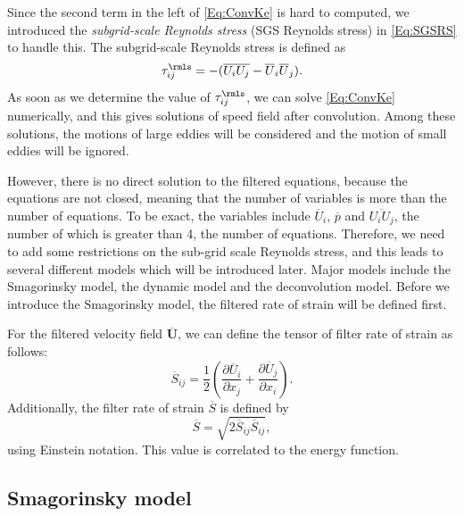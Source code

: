 \documentclass[english, nochinese]{pkupaper}
\begin{document}
Since the second term in the left of \eqref{Eq:ConvKe} is hard to computed, we introduced the \emph{subgrid-scale Reynolds stress} (SGS Reynolds stress) in \eqref{Eq:SGSRS} to handle this. The subgrid-scale Reynolds stress is defined as
\begin{equation}\label{Eq:SGSRS}
\tau_{ij}^{\rmls} = -(\overline{U_iU_j}-\overline{U}_i\overline{U}_j).
\end{equation}
As soon as we determine the value of $\tau_{ij}^{\rmls}$, we can solve \eqref{Eq:ConvKe} numerically, and this gives solutions of speed field after convolution. Among these solutions, the motions of large eddies will be considered and the motion of small eddies will be ignored.

However, there is no direct solution to the filtered equations, because the equations are not closed, meaning that the number of variables is more than the number of equations. To be exact, the variables include $\overline{U}_i$, $\overline{p}$ and $\overline{U_iU_j}$, the number of which is greater than 4, the number of equations. Therefore, we need to add some restrictions on the sub-grid scale Reynolds stress, and this leads to several different models which will be introduced later. Major models include the Smagorinsky model, the dynamic model and the deconvolution model. Before we introduce the Smagorinsky model, the filtered rate of strain will be defined first.

For the filtered velocity field $\overline{\mathbf{U}}$, we can define the tensor of filter rate of strain as follows:
\begin{equation}
\overline{S}_{ij} = \frac{1}{2}\left(\frac{\partial\overline{U}_i}{\partial x_j} + \frac{\partial\overline{U}_j}{\partial x_i}\right).
\end{equation}
Additionally, the filter rate of strain $\overline{S}$ is defined by
\begin{equation}
\overline{S} = \sqrt{2\overline{S}_{ij}\overline{S}_{ij}},
\end{equation}
using Einstein notation. This value is correlated to the energy function.

\subsection{Smagorinsky model}
\end{document}
